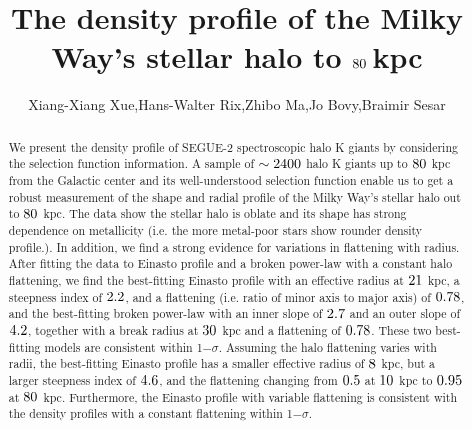 \documentclass[12pt,preprint]{aastex}
\begin{document}
\title{The density profile of the Milky Way's stellar halo to $\rm 80~$kpc}
\author{Xiang-Xiang Xue,Hans-Walter Rix,Zhibo Ma,Jo Bovy,Braimir Sesar}
\begin{abstract}
We present the density profile of SEGUE-2 spectroscopic halo K giants by considering the selection function information. A sample of $\rm \sim2400$ halo K giants up to $\rm 80~$kpc from the Galactic center and its well-understood selection function enable us to get a robust measurement of the shape and radial profile of the Milky Way's stellar halo out to $\rm 80~$kpc. The data show the stellar halo is oblate and its shape has strong dependence on metallicity (i.e. the more metal-poor stars show rounder density profile.). In addition, we find a strong evidence for variations in flattening with radius. After fitting the data to Einasto profile and a broken power-law with a constant halo flattening, we find the best-fitting Einasto profile with an effective radius at $\rm 21~$kpc, a steepness index of $\rm 2.2$, and a flattening (i.e. ratio of minor axis to major axis) of $\rm 0.78$, and the best-fitting broken power-law with an inner slope of $\rm 2.7$ and an outer slope of $\rm 4.2$, together with a break radius at $\rm 30~$kpc and a flattening of $\rm 0.78$. These two best-fitting models are consistent within 1$-\sigma$. Assuming the halo flattening varies with radii, the best-fitting Einasto profile has a smaller effective radius of $\rm 8~$kpc, but a larger steepness index of $\rm 4.6$, and the flattening changing from $\rm 0.5$ at $\rm 10~$kpc to $\rm 0.95$ at $\rm 80~$kpc. Furthermore, the Einasto profile with variable flattening is consistent with the density profiles with a constant flattening within 1$-\sigma$.
\end{abstract}
\end{document}
